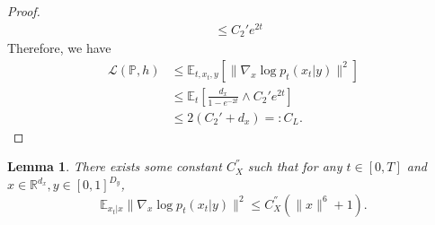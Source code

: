 \documentclass{article}
\numberwithin{equation}{section}
\newcommand{\E}{\mathbb{E}}
\newcommand{\R}{\mathbb{R}}
\newtheorem{lemma}[thm]{Lemma}
\theoremstyle{definition}
\renewcommand{\P}{\mathbb{P}}
\begin{document}
\begin{proof}
\begin{equation}
\begin{aligned}
        &\leq C_2'e^{2t}
        \end{aligned}
    \end{equation}
    Therefore, we have
    \begin{equation}
        \begin{aligned}
            \mathcal{L}(\P,h)
            &\leq \E_{t,x_t,y}[\|\nabla_x\log p_t(x_t|y)\|^2] \\
            &\leq \E_t[\frac{d_x}{1-e^{-2t}}\wedge C_2'e^{2t}] \\
            &\leq 2(C_2'+d_x)=:C_L.
        \end{aligned}
    \end{equation}
\end{proof}

\begin{lemma}\label{lem:bound score_t}
    There exists some constant $C_X^{''}$ such that for any $t\in[0,T]$ and $x\in\R^{d_x},y\in[0,1]^{D_y}$,
    \begin{equation}
        \E_{x_t|x}\|\nabla_x\log p_t(x_t|y)\|^2\leq C_X^{''}(\|x\|^6+1).
    \end{equation}
\end{lemma}
\end{document}
